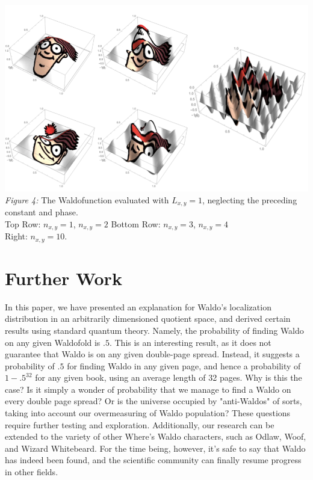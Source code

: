 \documentclass{article}
\begin{document}
\begin{center}
	\includegraphics[scale=.4]{graphs.png}\\
	\emph{Figure 4:} The Waldofunction evaluated with $L_{x,y} = 1$, neglecting the preceding constant and phase. \\Top Row: $n_{x,y} = 1$, $n_{x,y} = 2$ Bottom Row: $n_{x,y} = 3$, $n_{x,y} = 4$ \\Right: $n_{x,y} = 10$.	
\end{center}
\section{Further Work}
In this paper, we have presented an explanation for Waldo's localization distribution in an arbitrarily dimensioned quotient space, and derived certain results using standard quantum theory. Namely, the probability of finding Waldo on any given Waldofold is $.5$.  This is an interesting result, as it does not guarantee that Waldo is on any given double-page spread. Instead, it suggests a probability of $.5$ for finding Waldo in any given page, and hence a probability of $1-.5^{32}$ for any given book, using an average length of 32 pages. Why is this the case? Is it simply a wonder of probability that we manage to find a Waldo on every double page spread? Or is the universe occupied by "anti-Waldos" of sorts, taking into account our overmeasuring of Waldo population? These questions require further testing and exploration. Additionally, our research can be extended to the variety of other Where's Waldo characters, such as Odlaw, Woof, and Wizard Whitebeard. For the time being, however, it's safe to say that Waldo has indeed been found, and the scientific community can finally resume progress in other fields.
\end{document}

